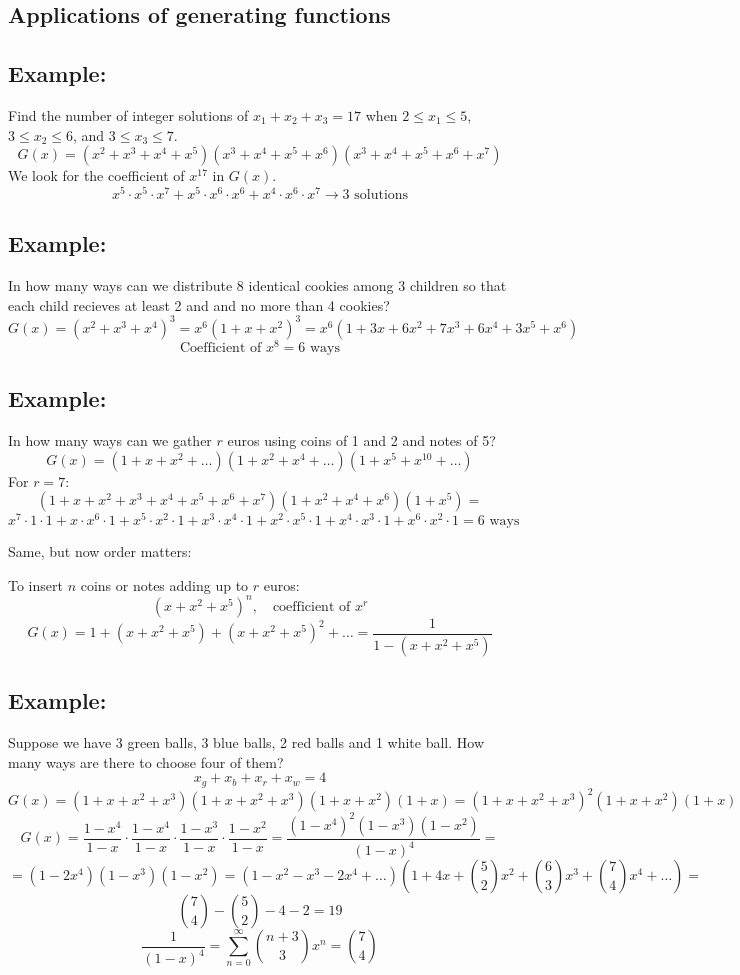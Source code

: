 \documentclass[11pt]{article}
\begin{document}
\subsection{Applications of generating functions}
\subsection*{Example:}
Find the number of integer solutions of $x_1 + x_2 + x_3 = 17$ when $2 \leq x_1 \leq 5$, $3 \leq x_2 \leq 6$, and $3 \leq x_3 \leq 7$.
\[
G(x) = (x^2 + x^3 + x^4 + x^5)(x^3 + x^4 + x^5 + x^6)(x^3 + x^4 + x^5 + x^6 + x^7)
\]
We look for the coefficient of $x^{17}$ in $G(x)$.
\[
x^5 \cdot x^5 \cdot x^7 + x^5 \cdot x^6 \cdot x^6 + x^4 \cdot x^6 \cdot x^7 \rightarrow 3 \text{ solutions}
\]

\subsection*{Example:}
In how many ways can we distribute 8 identical cookies among 3 children so that each child recieves at least 2 and and no more than 4 cookies?
\[
G(x) = (x^2 + x^3 + x^4)^3 = x^6 (1 + x + x^2)^3 = x^6 (1 + 3x + 6x^2 + 7x^3 + 6x^4 + 3x^5 + x^6)
\]
\[
\text{Coefficient of } x^8 = 6 \text{ ways}
\]

\subsection*{Example:}
In how many ways can we gather $r$ euros using coins of 1 and 2 and notes of 5?
\[
G(x) = (1 + x + x^2 + \dots)(1 + x^2 + x^4 + \dots)(1 + x^5 + x^{10} + \dots) 
\]
For $r = 7$:
\[
(1 + x + x^2 + x^3 + x^4 + x^5 + x^6 + x^7)(1 + x^2 + x^4 + x^6)(1 + x^5) =
\]
\[
x^7 \cdot 1 \cdot 1 + x \cdot x^6 \cdot 1 + x^5 \cdot x^2 \cdot 1 + x^3 \cdot x^4 \cdot 1 + x^2 \cdot x^5 \cdot 1 + x^4 \cdot x^3 \cdot 1 + x^6 \cdot x^2 \cdot 1 = 6 \text{ ways}
\]

Same, but now order matters:

To insert $n$ coins or notes adding up to $r$ euros:
\[
(x + x^2 + x^5)^n, \quad \text{coefficient of } x^r
\]
\[
G(x) = 1 + (x + x^2 + x^5) + (x + x^2 + x^5)^2 + \dots = \frac{1}{1 - (x + x^2 + x^5)}
\]

\subsection*{Example:}
Suppose we have 3 green balls, 3 blue balls, 2 red balls and 1 white ball. How many ways are there to choose four of them?
\[
x_g + x_b + x_r + x_w = 4
\]
\[
G(x) = (1 + x + x^2 + x^3)(1 + x + x^2 + x^3)(1 + x + x^2) (1 + x) = (1 + x + x^2 + x^3)^2 (1 + x + x^2) (1 + x)
\]
\[
G(x) = \frac{1 - x^4}{1 - x} \cdot \frac{1 - x^4}{1 - x} \cdot \frac{1 - x^3}{1 - x} \cdot \frac{1 - x^2}{1 - x} = \frac{(1 - x^4)^2 (1 - x^3) (1 - x^2)}{(1 - x)^4} = 
\]
\[
= (1 - 2x^4)(1 - x^3)(1 - x^2) = (1 - x^2 - x^3 - 2x^4 + \dots)(1 + 4x + \binom{5}{2}x^2 + \binom{6}{3}x^3 + \binom{7}{4}x^4 + \dots) =
\]
\[
\binom{7}{4} - \binom{5}{2} - 4 - 2 = 19
\]
\[
\frac{1}{(1 - x)^4} = \sum_{n = 0}^{\infty} \binom{n + 3}{3} x^n = \binom{7}{4}
\]
\end{document}
